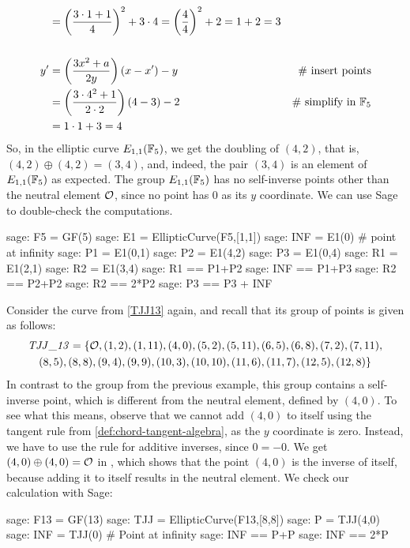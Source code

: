 \begin{example}
\begin{align*}
    & = \left(\frac{3\cdot 1+1}{4}\right)^2 +3\cdot 4
      = \left(\frac{4}{4}\right)^2 +2
      = 1 +2 
      = 3
\\
\\
y'  & = \left(\frac{3x^2+a}{2y}\right)\left(x-x'\right) - y  & \text{\# insert points} \\
    & = \left(\frac{3\cdot 4^2+1}{2\cdot 2}\right)\left(4-3\right) - 2 & \text{\# simplify in } \mathbb{F}_5\\
    & = 1\cdot 1 + 3
      = 4
\end{align*}
So, in the elliptic curve $E_{1,1}(\mathbb{F}_5)$, we get the doubling  of $(4,2)$, that is, $(4,2)\oplus (4,2) =(3,4)$, and, indeed, the pair $(3,4)$ is an element of $E_{1,1}(\mathbb{F}_5)$ as expected. The group $E_{1,1}(\mathbb{F}_5)$ has no self-inverse points other than the neutral element $\mathcal{O}$, since no point has $0$ as its $y$ coordinate. We can use Sage to double-check the computations. 
\begin{sagecommandline}
sage: F5 = GF(5)
sage: E1 = EllipticCurve(F5,[1,1])
sage: INF = E1(0) # point at infinity
sage: P1 = E1(0,1)
sage: P2 = E1(4,2)
sage: P3 = E1(0,4)
sage: R1 = E1(2,1)
sage: R2 = E1(3,4)
sage: R1 == P1+P2
sage: INF == P1+P3
sage: R2 == P2+P2
sage: R2 == 2*P2
sage: P3 == P3 + INF
\end{sagecommandline}
\end{example}
\begin{example}\label{ex:TJJ13-self-inverse} Consider the \TJJ{} curve from \examplename{} \ref{TJJ13} again, and recall that its group of points is given as follows:
\begin{multline}
\mathit{TJJ\_13} = \{\mathcal{O}, (1, 2), (1, 11), (4, 0), (5, 2), (5, 11), (6, 5), (6, 8), (7,2), (7, 11), \\ (8, 5), (8, 8), (9, 4), (9, 9), (10, 3), (10,
10), (11, 6), (11, 7), (12, 5), (12, 8)\}
\end{multline}
In contrast to the group from the previous example, this group contains a self-inverse point, which is different from the neutral element, defined by $(4,0)$. To see what this means, observe that we cannot add $(4,0)$ to itself using the tangent rule from  \ref{def:chord-tangent-algebra}, as the $y$ coordinate is zero. Instead, we have to use the rule for additive inverses, since $0=-0$. We get $(4,0)\oplus (4,0)=\mathcal{O}$ in \TJJ{}, which shows that the point $(4,0)$ is  the inverse of itself, because adding it to itself results in the neutral element. We check our calculation with Sage:

\begin{sagecommandline}
sage: F13 = GF(13)
sage: TJJ = EllipticCurve(F13,[8,8])
sage: P = TJJ(4,0)
sage: INF = TJJ(0) # Point at infinity
sage: INF == P+P
sage: INF == 2*P
\end{sagecommandline}
\end{example}
